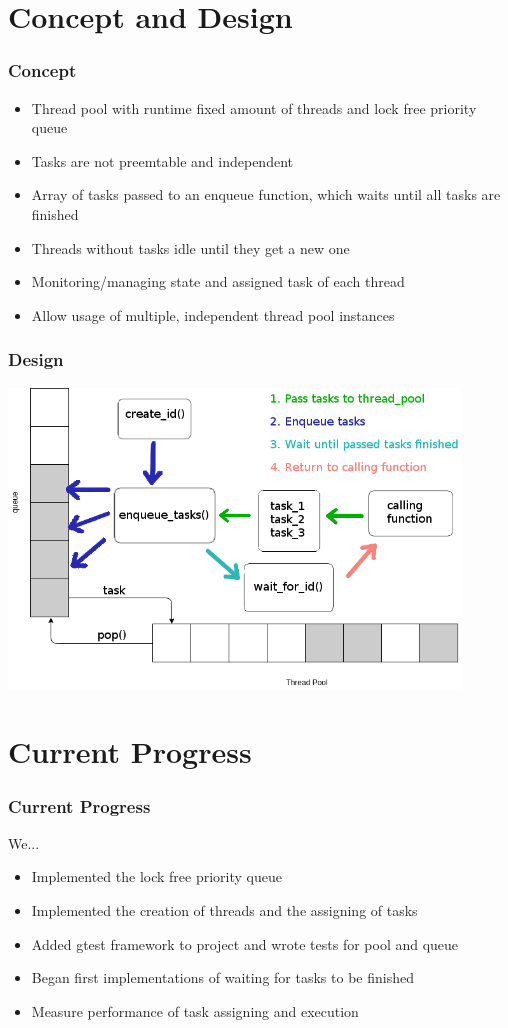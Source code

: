 \documentclass{beamer}
\begin{document}
\section{Concept and Design}
\begin{frame}
	\frametitle{Concept}
	\begin{itemize}
		\item Thread pool with runtime fixed amount of threads and lock free priority queue
		\item Tasks are not preemtable and independent
		\item Array of tasks passed to an enqueue function, which waits until all tasks are finished
		\item Threads without tasks idle until they get a new one
		\item Monitoring/managing state and assigned task of each thread
		\item Allow usage of multiple, independent thread pool instances 
	\end{itemize}
\end{frame}

\begin{frame}
\frametitle{Design}
	\begin{center}
		\includegraphics[width=0.9\textwidth]{img/pool_queue.png}
	\end{center}
\end{frame}

\section{Current Progress}
\begin{frame}
	\frametitle{Current Progress}
	We...
	\begin{itemize}
		\item Implemented the lock free priority queue 
		\item Implemented the creation of threads and the assigning of tasks
		\item Added gtest framework to project and wrote tests for pool and queue
		\item Began first implementations of waiting for tasks to be finished
		\item Measure performance of task assigning and execution
	\end{itemize}
\end{frame}
\end{document}
